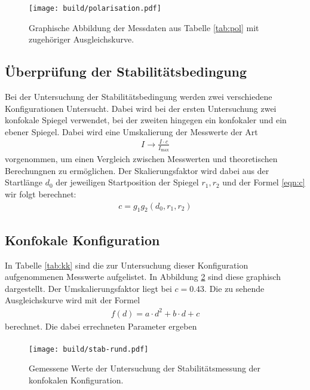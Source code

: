 \begin{figure}[htb]
  \centering
  \texttt{[image: build/polarisation.pdf]}
  \caption{Graphische Abbildung der Messdaten aus Tabelle \ref{tab:pol} mit zugehöriger Ausgleichskurve.}
  \label{plt:pol}
\end{figure}
\FloatBarrier


\FloatBarrier

\subsection{Überprüfung der Stabilitätsbedingung}
Bei der Untersuchung der Stabilitätsbedingung werden zwei verschiedene
Konfigurationen Untersucht. Dabei wird bei der ersten Untersuchung zwei
konfokale Spiegel verwendet, bei der zweiten hingegen ein konfokaler und
ein ebener Spiegel. Dabei wird eine Umskalierung der Messwerte der Art
\begin{align*}
  I \rightarrow \frac{I \cdot c}{I_\text{max}}
\end{align*}
vorgenommen, um einen Vergleich zwischen Messwerten und theoretischen
Berechungnen zu ermöglichen.
Der Skalierungsfaktor wird dabei aus der Startlänge $d_0$ der jeweiligen
Startposition der Spiegel $r_1, r_2$ und der Formel \ref{eqn:c} wir folgt
berechnet:
\begin{align*}
  c = g_1g_2(d_0,r_1,r_2)
  \label{eqn:c}
\end{align*}

\subsection{Konfokale Konfiguration}
In Tabelle \ref{tab:kk} sind die zur Untersuchung dieser Konfiguration
aufgenommenen Messwerte aufgelistet. In Abbildung \ref{plt:kk} sind diese
graphisch dargestellt. Der Umskalierungsfaktor liegt bei $c = \num{0,43}$. Die zu
sehende Ausgleichskurve wird mit der Formel
\begin{align*}
  f(d) = a\cdot d^2 + b\cdot d + c
\end{align*}
berechnet. Die dabei errechneten Parameter ergeben
\begin{align*}
\end{align*}

\begin{figure}[htb]
  \centering
  \texttt{[image: build/stab-rund.pdf]}
  \caption{Gemessene Werte der Untersuchung der Stabilitätsmessung der konfokalen Konfiguration. }
  \label{plt:kk}
\end{figure}
\FloatBarrier

